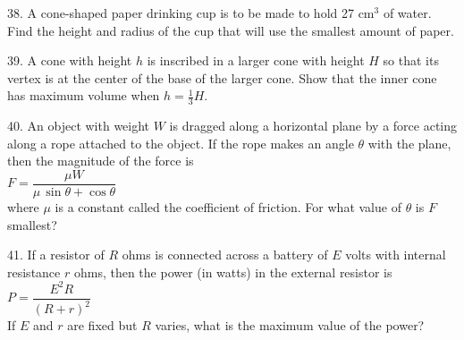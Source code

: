 \documentclass{sebase}
\begin{document}
\begin{multicols}{2}
\begin{ExerciseList}
%

\item[\hfill 38.] A cone-shaped paper drinking cup is to be made to hold 27
cm$^{3}$ of water. Find the height and radius of the cup that will use the
smallest amount of paper.

%

\item[\hfill 39.] A cone with height $h$ is inscribed in a larger cone with
height $H$ so that its vertex is at the center of the base of the larger
cone. Show that the inner cone has maximum volume when $h=\frac{1}{3}H$.

%

%

\item[\hfill 40.] An object with weight $W$ is dragged along a horizontal
plane by a force acting along a rope attached to the object. If the rope
makes an angle $\theta $ with the plane, then the magnitude of the force is 
\\[6pt]
\hspace*{\fill}$F=\dfrac{\mu W}{\mu \,\sin \theta +\cos \theta }$\hspace*{%
\fill}\\[6pt]
where $\mu $ is a constant called the coefficient of friction. For what
value of $\theta $ is $F$ smallest?

%

\item[\hfill 41.] If a resistor of $R$ ohms is connected across a battery of 
$E$ volts with internal resistance $r$ ohms, then the power (in watts) in
the external resistor is\\[6pt]
\hspace*{\fill}$P=\dfrac{E^{2}R}{(R+r)^{2}}$\hspace*{\fill}\\[6pt]
If $E$ and $r$ are fixed but $R$ varies, what is the maximum value of the
power?


\end{ExerciseList}
\end{multicols}
\end{document}
